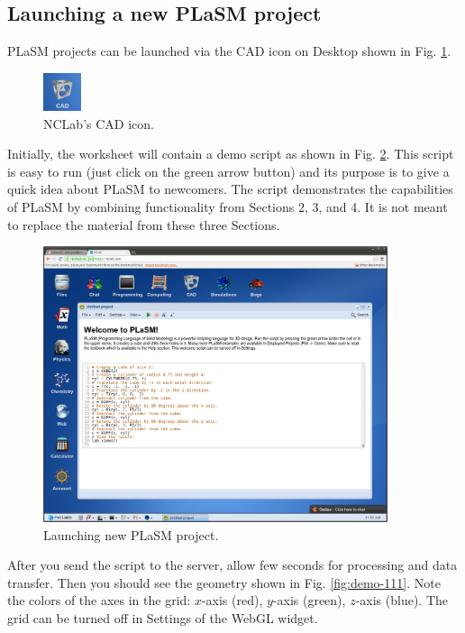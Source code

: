 \subsection{Launching a new PLaSM project}


PLaSM projects can be launched via the CAD icon on Desktop shown in
Fig. \ref{fig:cadicon}.

\begin{figure}[!ht]
\begin{center}
\includegraphics[width=0.1\textwidth]{img/cadicon.png}
\end{center}
\vspace{-2mm}
\caption{NCLab's CAD icon.}
\vspace{-1cm}
\label{fig:cadicon}
\end{figure}
\newpage
\noindent
Initially, the worksheet will contain a demo script
as shown in Fig. \ref{fig:python}. This script is easy to run 
(just click on the green arrow button) and its purpose is to 
give a quick idea about PLaSM to newcomers. The script 
demonstrates the capabilities of PLaSM by combining
functionality from Sections 2, 3, and 4. It is not meant to 
replace the material from these three Sections.


\begin{figure}[!ht]
\begin{center}
\includegraphics[width=0.9\textwidth]{img/python.png}
\end{center}
\vspace{-2mm}
\caption{Launching new PLaSM project.}
\label{fig:python}
\end{figure}
\noindent
After you send the script to the server, allow few seconds 
for processing and data transfer. Then you should see the geometry 
shown in Fig. \ref{fig:demo-111}. Note the colors of the axes in
the grid: $x$-axis (red), $y$-axis (green), $z$-axis (blue). The 
grid can be turned off in Settings of the WebGL widget.


